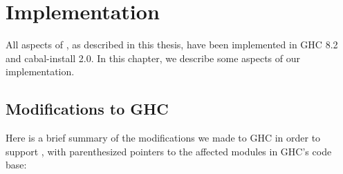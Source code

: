 \chapter{Implementation}
\label{sec:implementation}

All aspects of \Backpack{}, as described in this thesis,
have been implemented in GHC 8.2 and cabal-install 2.0.  In this
chapter, we describe some aspects of our implementation.

\section{Modifications to GHC}

Here is a brief summary of the modifications we made to
GHC in order to support \Backpack{}, with parenthesized pointers to the
affected modules in GHC's code base:

